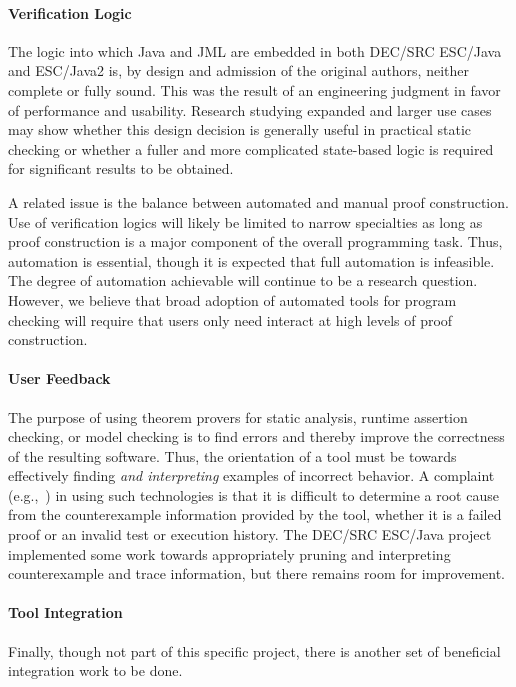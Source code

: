 \documentclass{sig-alternate}
\begin{document}
\paragraph*{Verification Logic} The logic into which Java and JML are
embedded in both DEC/SRC ESC/Java and ESC/Java2 is, by design and admission of the original
authors, neither complete or fully sound.  This was the result of an
engineering judgment in favor of performance and usability.  Research
studying expanded and larger use cases may show whether this
design decision is generally useful in practical static checking or
whether a fuller and more complicated state-based logic is required
for significant results to be obtained. 

A related issue is the balance between automated and manual proof construction.
Use of verification logics will likely be limited to narrow specialties as long as proof
construction is a major component of the overall programming task.  Thus, automation
is essential, though it is expected that full automation is infeasible.  The degree of
automation achievable will continue to be a research question. 
However, we believe that broad adoption of automated tools for program checking 
will require that users only need interact at high levels of proof construction.

\paragraph*{User Feedback} The purpose of using theorem provers for
static analysis, runtime assertion checking, or model checking is to
find errors and thereby improve the correctness of the resulting
software.  Thus, the orientation of a tool must be towards effectively
finding \emph{and interpreting} examples of incorrect behavior.  A
complaint (e.g.,~\cite{GroceVisser03}) in using such technologies is that it is difficult
to determine a root cause from the counterexample information provided
by the tool, whether it is a failed proof or an invalid test or
execution history.  The DEC/SRC ESC/Java project implemented some work towards
appropriately pruning and interpreting counterexample and trace information, but
there remains room for improvement.

\paragraph*{Tool Integration} Finally, though not part of this specific
project, there is another set of beneficial integration work to be
done.
\end{document}
